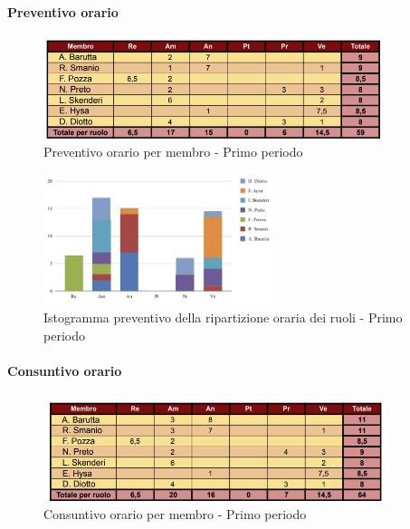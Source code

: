 \paragraph{Preventivo orario}

\begin{figure}[H] 
    \centering
    \includegraphics[width=0.9\textwidth]{../Images/tabPrev1.png}
    \caption{Preventivo orario per membro - Primo periodo}
    \label{fig:Preventivo_orario_1}
\end{figure}

\vspace{0.6cm}

\begin{figure}[H]
    \centering
    \includegraphics[width=0.6\textwidth]{../Images/graficoPrev1.png}
    \caption{Istogramma preventivo della ripartizione oraria dei ruoli - Primo periodo}
    \label{fig:Preventivo_ripartizione_oraria_1}
\end{figure}

\pagebreak

\paragraph{Consuntivo orario}

\begin{figure}[H]
    \centering
    \includegraphics[width=0.9\textwidth]{../Images/tabCons1.png}
    \caption{Consuntivo orario per membro - Primo periodo}
    \label{fig:Constuntivo_orario_1}
\end{figure}


